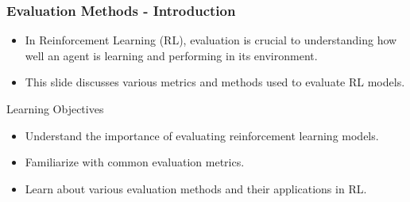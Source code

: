 \documentclass[aspectratio=169]{beamer}
\begin{document}
\begin{frame}[fragile]
    \frametitle{Evaluation Methods - Introduction}
    \begin{itemize}
        \item In Reinforcement Learning (RL), evaluation is crucial to understanding how well an agent is learning and performing in its environment.
        \item This slide discusses various metrics and methods used to evaluate RL models.
    \end{itemize}
    
    \begin{block}{Learning Objectives}
        \begin{itemize}
            \item Understand the importance of evaluating reinforcement learning models.
            \item Familiarize with common evaluation metrics.
            \item Learn about various evaluation methods and their applications in RL.
        \end{itemize}
    \end{block}
\end{frame}
\end{document}
